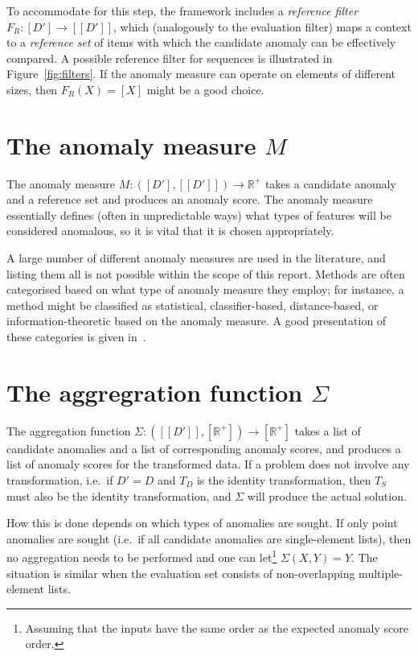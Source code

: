 To accommodate for this step, the framework includes a \emph{reference filter} $F_R: [D'] \rightarrow [[D']] $, which (analogously to the evaluation filter) maps a context to a \emph{reference set} of items with which the candidate anomaly can be effectively compared. A possible reference filter for sequences is illustrated in Figure~\ref{fig:filters}. If the anomaly measure can operate on elements of different sizes, then $F_R(X) = [X]$ might be a good choice.

\section{The anomaly measure $M$}

The anomaly measure $M: ([D'], [[D']]) \rightarrow \mathbb{R}^+$ takes a candidate anomaly and a reference set and produces an anomaly score. The anomaly measure essentially defines (often in unpredictable ways) what types of features will be considered anomalous, so it is vital that it is chosen appropriately.

A large number of different anomaly measures are used in the literature, and listing them all is not possible within the scope of this report. Methods are often categorised based on what type of anomaly measure they employ; for instance, a method might be classified as statistical, classifier-based, distance-based, or information-theoretic based on the anomaly measure. A good presentation of these categories is given in~\cite{chandola}.

\section{The aggregration function $\Sigma$}
\label{sect:aggregation_function}

The aggregation function $\Sigma: ([[D']], [\mathbb{R}^+]) \rightarrow [\mathbb{R}^+]$ takes a list of candidate anomalies and a list of corresponding anomaly scores, and produces a list of anomaly scores for the transformed data. If a problem does not involve any transformation, i.e.\ if  $D' = D$ and $T_D$ is the identity transformation, then $T_S$ must also be the identity transformation, and $\Sigma$ will produce the actual solution.

How this is done depends on which types of anomalies are sought. If only point anomalies are sought (i.e.\ if all candidate anomalies are single-element lists), then no aggregation needs to be performed and one can let\footnote{Assuming that the inputs have the same order as the expected anomaly score order.} $\Sigma(X, Y) = Y$. The situation is similar when the evaluation set consists of non-overlapping multiple-element lists.

